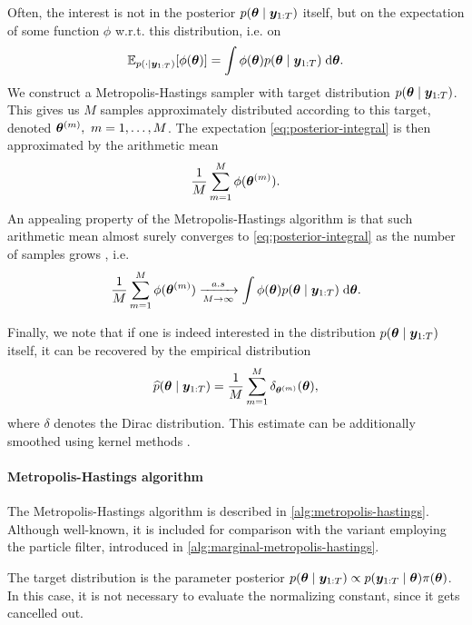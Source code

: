 Often, the interest is not in the posterior $p(\bm{\theta} \mid \bm{y}_{1:T})$ itself, but on the expectation of some function $\phi$ w.r.t. this distribution, i.e. on
\begin{equation} \label{eq:posterior-integral}
\mathbb{E}_{p(\cdot \mid \bm{y}_{1:T})}[\phi(\bm{\theta})] = \int \phi(\bm{\theta}) p(\bm{\theta} \mid \bm{y}_{1:T}) \; \mathrm{d}{\bm{\theta}}.
\end{equation}
We construct a Metropolis-Hastings sampler \citep{metropolis, hastings} with target distribution $p(\bm{\theta} \mid \bm{y}_{1:T})$. This gives us $M$ samples approximately distributed according to this target, denoted $\bm{\theta}^{(m)},\ m = 1, \ldots, M$. The expectation \eqref{eq:posterior-integral} is then approximated by the arithmetic mean
\begin{equation*}
\frac{1}{M} \sum_{m=1}^M \phi(\bm{\theta}^{(m)}).
\end{equation*}
An appealing property of the Metropolis-Hastings algorithm is that such arithmetic mean almost surely converges to \eqref{eq:posterior-integral} as the number of samples grows \citep{robert-casella}, i.e.
\begin{equation*}
\frac{1}{M} \sum_{m=1}^M \phi(\bm{\theta}^{(m)}) \xrightarrow[M \to \infty]{a.s} \int \phi(\bm{\theta}) p(\bm{\theta} \mid \bm{y}_{1:T}) \; \mathrm{d}{\bm{\theta}}.
\end{equation*}

Finally, we note that if one is indeed interested in the distribution $p(\bm{\theta} \mid \bm{y}_{1:T})$ itself, it can be recovered by the empirical distribution
\begin{equation*}
\widehat{p}(\bm{\theta} \mid \bm{y}_{1:T}) = \frac{1}{M} \sum_{m=1}^M \delta_{\bm{\theta}^{(m)}}(\bm{\theta}),
\end{equation*}
where $\delta$ denotes the Dirac distribution. This estimate can be additionally smoothed using kernel methods \citep{kernel-smoothing}.


\paragraph{Metropolis-Hastings algorithm}
The Metropolis-Hastings algorithm is described in \autoref{alg:metropolis-hastings}. Although well-known, it is included for comparison with the variant employing the particle filter, introduced in \autoref{alg:marginal-metropolis-hastings}.

The target distribution is the parameter posterior $p(\bm{\theta} \mid \bm{y}_{1:T}) \propto p(\bm{y}_{1:T} \mid \bm{\theta}) \pi(\bm{\theta})$. In this case, it is not necessary to evaluate the normalizing constant, since it gets cancelled out.

